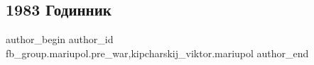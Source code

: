  
 
 
 
 

\subsection{1983 Годинник}
\label{sec:21_02_2023.fb.fb_group.mariupol.pre_war.1.1983_godinnik}
 
\ifcmt
 author_begin
   author_id fb_group.mariupol.pre_war,kipcharskij_viktor.mariupol
 author_end
\fi

